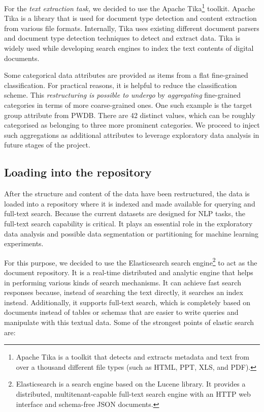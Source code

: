 For the \textit{text extraction task,} we decided to use the Apache Tika\footnote{ Apache Tika is a toolkit that detects and extracts metadata and text from over a thousand different file types (such as HTML, PPT, XLS, and PDF). } toolkit. Apache Tika is a library that is used for document type detection and content extraction from various file formats. Internally, Tika uses existing different document parsers and document type detection techniques to detect and extract data. Tika is widely used while developing search engines to index the text contents of digital documents.

Some categorical data attributes are provided as items from a flat fine-grained classification. For practical reasons, it is helpful to reduce the classification scheme. This \textit{restructuring is possible to undergo} by \textit{aggregating} fine-grained categories in terms of more coarse-grained ones. One such example is the target group attribute from PWDB. There are 42 distinct values, which can be roughly categorised as belonging to three more prominent categories. We proceed to inject such aggregations as additional attributes to leverage exploratory data analysis in future stages of the project. 

\subsection{Loading into the repository}

After the structure and content of the data have been restructured, the data is loaded into a repository where it is indexed and made available for querying and full-text search. Because the current datasets are designed for NLP tasks, the full-text search capability is critical. It plays an essential role in the exploratory data analysis and possible data segmentation or partitioning for machine learning experiments. 

For this purpose, we decided to use the Elasticsearch search engine\footnote{ Elasticsearch is a search engine based on the Lucene library. It provides a distributed, multitenant-capable full-text search engine with an HTTP web interface and schema-free JSON documents. } to act as the document repository. It is a real-time distributed and analytic engine that helps in performing various kinds of search mechanisms. It can achieve fast search responses because, instead of searching the text directly, it searches an index instead. Additionally, it supports full-text search, which is completely based on documents instead of tables or schemas that are easier to write queries and manipulate with this textual data. Some of the strongest points of elastic search are:

